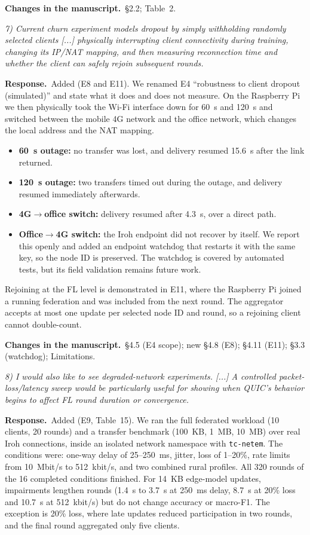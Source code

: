 \documentclass[11pt,a4paper]{article}
\newenvironment{comment}{\par\medskip\noindent\begin{minipage}{\linewidth}\color{blue!45!black}\itshape}{\end{minipage}\par}
\newcommand{\reply}{\par\smallskip\noindent\textbf{Response.}~}
\newcommand{\changes}{\par\smallskip\noindent\textbf{Changes in the manuscript.}~}
\begin{document}
\changes \S2.2; Table~2.

\begin{comment}
7) Current churn experiment models dropout by simply withholding randomly selected clients [...] physically interrupting client connectivity during training, changing its IP/NAT mapping, and then measuring reconnection time and whether the client can safely rejoin subsequent rounds.
\end{comment}
\reply Added (E8 and E11). We renamed E4 ``robustness to client dropout (simulated)'' and state what it does and does not measure. On the Raspberry Pi we then physically took the Wi-Fi interface down for 60~s and 120~s and switched between the mobile 4G network and the office network, which changes the local address and the NAT mapping.
\begin{itemize}[leftmargin=1.3em,itemsep=0.1em]
\item \textbf{60~s outage:} no transfer was lost, and delivery resumed 15.6~s after the link returned.
\item \textbf{120~s outage:} two transfers timed out during the outage, and delivery resumed immediately afterwards.
\item \textbf{4G$\to$office switch:} delivery resumed after 4.3~s, over a direct path.
\item \textbf{Office$\to$4G switch:} the Iroh endpoint did not recover by itself. We report this openly and added an endpoint watchdog that restarts it with the same key, so the node ID is preserved. The watchdog is covered by automated tests, but its field validation remains future work.
\end{itemize}
Rejoining at the FL level is demonstrated in E11, where the Raspberry Pi joined a running federation and was included from the next round. The aggregator accepts at most one update per selected node ID and round, so a rejoining client cannot double-count.

\changes \S4.5 (E4 scope); new \S4.8 (E8); \S4.11 (E11); \S3.3 (watchdog); Limitations.

\begin{comment}
8) I would also like to see degraded-network experiments. [...] A controlled packet-loss/latency sweep would be particularly useful for showing when QUIC's behavior begins to affect FL round duration or convergence.
\end{comment}
\reply Added (E9, Table~15). We ran the full federated workload (10 clients, 20 rounds) and a transfer benchmark (100~KB, 1~MB, 10~MB) over real Iroh connections, inside an isolated network namespace with \texttt{tc-netem}. The conditions were: one-way delay of 25--250~ms, jitter, loss of 1--20\%, rate limits from 10~Mbit/s to 512~kbit/s, and two combined rural profiles. All 320 rounds of the 16 completed conditions finished. For 14~KB edge-model updates, impairments lengthen rounds (1.4~s to 3.7~s at 250~ms delay, 8.7~s at 20\% loss and 10.7~s at 512~kbit/s) but do not change accuracy or macro-F1. The exception is 20\% loss, where late updates reduced participation in two rounds, and the final round aggregated only five clients.
\end{document}
